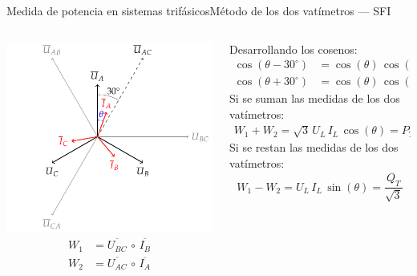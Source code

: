 \documentclass[aspectratio=169, xcolor={usenames,svgnames,dvipsnames}]{beamer}
\begin{document}
\begin{frame}{Medida de potencia en sistemas trifásicos}{Método de los dos vatímetros --- SFI}
\begin{columns}
\begin{column}{0.38\columnwidth}
	    \centering
	    \includegraphics[width=0.8\linewidth]{../figs/fasores_potencia3H.pdf}
	    \begin{align*}
	    W_1&=\overline{U_{BC}}\,\circ\,\overline{I_B}\\ 
	    W_2&=\overline{U_{AC}}\,\circ\,\overline{I_A}
	\end{align*}
\end{column}
\begin{column}{0.6\columnwidth}
Desarrollando los cosenos:
\begin{align*}
  \cos(\theta-{30^\circ}) &= \cos(\theta)\,\cos({30^\circ}) + \sin(\theta)\,\sin({30^\circ})\\
  \cos(\theta+{30^\circ}) &= \cos(\theta)\,\cos({30^\circ}) - \sin(\theta)\,\sin({30^\circ})
\end{align*}
Si se suman las medidas de los dos vatímetros:
\begin{align*}
     \boxed{W_1 + W_2 = \sqrt{3}\,U_L\, I_L\,\cos(\theta) = P_T}
\end{align*}
Si se restan las medidas de los dos vatímetros:
\begin{align*}
    \boxed{W_1 - W_2 = U_L\, I_L\,\sin(\theta) = \dfrac{Q_T}{\sqrt{3}}}
\end{align*}
\end{column}
\end{columns}
\end{frame}
\end{document}
